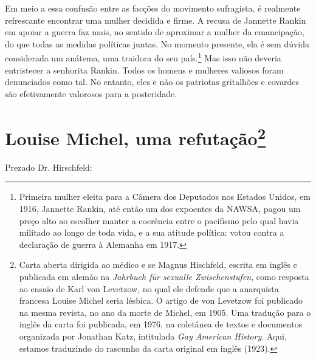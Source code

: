 Em meio a essa confusão entre as facções do movimento sufragista, é
realmente refrescante encontrar uma mulher decidida e firme. A recusa de
Jannette Rankin em apoiar a guerra faz mais, no sentido de aproximar a
mulher da emancipação, do que todas as medidas políticas juntas. No
momento presente, ela é sem dúvida considerada um anátema, uma traidora
do seu país.\footnote{Primeira mulher eleita para a Câmera dos Deputados
  nos Estados Unidos, em 1916, Jannette Rankin, até então um dos
  expoentes da NAWSA, pagou um preço alto ao escolher manter a coerência
  entre o pacifismo pelo qual havia militado ao longo de toda vida, e a
  sua atitude política: votou contra a declaração de guerra à Alemanha
  em 1917.} Mas isso não deveria entristecer a senhorita Rankin. Todos
os homens e mulheres valiosos foram denunciados como tal. No entanto,
eles e não os patriotas gritalhões e covardes são efetivamente valorosos
para a posteridade.

\chapter[Louise Michel, uma refutação (1923)]{Louise Michel, uma refutação\footnote[*]{Carta aberta dirigida ao médico e
  se Magnus Hischfeld, escrita em inglês e publicada em alemão na
  \emph{Jahrbuch für sexualle Zwischenstufen}, como resposta ao ensaio
  de Karl von Levetzow, no qual ele defende que a anarquista francesa
  Louise Michel seria lésbica. O artigo de von Levetzow foi publicado na
  mesma revista, no ano da morte de Michel, em 1905. Uma tradução para o
  inglês da carta foi publicada, em 1976, na coletânea de textos e
  documentos organizada por Jonathan Katz, intitulada \emph{Gay American
  History}. Aqui, estamos traduzindo do rascunho da carta original em
  inglês (1923).}}



Prezado Dr. Hirschfeld:

